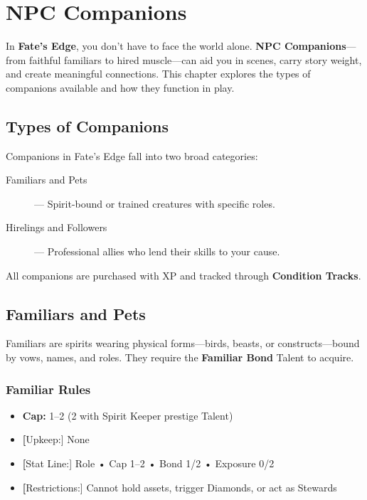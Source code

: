 
\chapter{NPC Companions}

In \textbf{Fate’s Edge}, you don’t have to face the world alone. \textbf{NPC Companions}—from faithful familiars to hired muscle—can aid you in scenes, carry story weight, and create meaningful connections. This chapter explores the types of companions available and how they function in play.

\section{Types of Companions}

Companions in Fate’s Edge fall into two broad categories:

\begin{description}
  \item[Familiars and Pets] — Spirit-bound or trained creatures with specific roles.
  \item[Hirelings and Followers] — Professional allies who lend their skills to your cause.
\end{description}

All companions are purchased with XP and tracked through \textbf{Condition Tracks}.

\section{Familiars and Pets}

Familiars are spirits wearing physical forms—birds, beasts, or constructs—bound by vows, names, and roles. They require the \textbf{Familiar Bond} Talent to acquire.

\subsection*{Familiar Rules}

\begin{itemize}
  \item \textbf{Cap:} 1–2 (2 with Spirit Keeper prestige Talent)
  \item \textbf[Upkeep:] None
  \item \textbf[Stat Line:] Role • Cap 1–2 • Bond 1/2 • Exposure 0/2
  \item \textbf[Restrictions:] Cannot hold assets, trigger Diamonds, or act as Stewards
\end{itemize}

